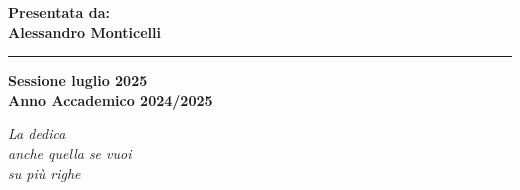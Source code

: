 \documentclass[12pt,a4paper,twoside]{book}
\begin{document}
\begin{titlepage}
\begin{minipage}[t]{0.40\textwidth}
        \vspace{3mm}

    \end{minipage}
    \hfill
    \begin{minipage}[t]{0.40\textwidth}\raggedleft
        {\Large{\bf Presentata da: \\ Alessandro Monticelli}}
    \end{minipage}

    \vspace{30mm}

    \rule[0.5cm]{15.8cm}{0.6mm}

    \begin{center}
        {\large{\bf Sessione luglio 2025 \\}}
        {\large{\bf Anno Accademico 2024/2025\\}}
    \end{center}

\end{titlepage}

\restoregeometry
\newpage




\topmargin=5.5cm
\begin{flushright}
    \emph{
        \LARGE{La dedica}\\\vspace{2mm}
        \LARGE{anche quella se vuoi}\\\vspace{3mm}
        \LARGE{su più righe}
    }
\end{flushright}
\newpage~\newpage
{}
\end{document}
